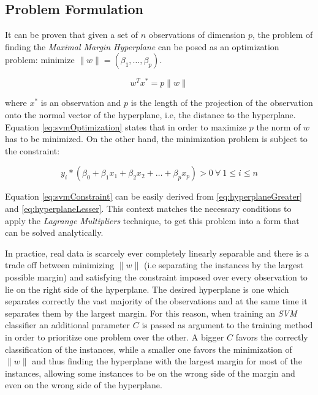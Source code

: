 \subsection{Problem Formulation}

It can be proven that given a set of $n$ observations of dimension $p$, the problem of
finding the \textit{Maximal Margin Hyperplane} can be posed as an optimization problem:
minimize $\| w \| = (\beta_{1}, \dotsc, \beta_{p})$.

\begin{equation}
\label{eq:svmOptimization}
w^{T}x^{*} = p\| w \|
\end{equation}

where $x^{*}$ is an observation and $p$ is the length of the projection of the observation
onto the normal vector of the hyperplane, i.e, the distance to the hyperplane.
Equation \ref{eq:svmOptimization} states that in order to maximize $p$ the norm of $w$
has to be minimized. On the other hand, the minimization problem is subject to the constraint:

\begin{equation}
  \label{eq:svmConstraint}
  y_{i} * (\beta_{0} + \beta_{1}x_{1} + \beta_{2}x_{2} + \dotsc + \beta_{p}x_{p}) > 0 \ \forall \ 1 \leq i \leq {n}
\end{equation}

Equation \ref{eq:svmConstraint} can be easily derived from \ref{eq:hyperplaneGreater} and
\ref{eq:hyperplaneLesser}.  This context matches the necessary conditions to apply
the \textit{Lagrange Multipliers} technique, to get this problem into a form
that can be solved analytically.

In practice, real data is scarcely ever completely linearly separable
and there is a trade off between
minimizing $\| w \|$ (i.e separating the instances by the largest possible margin)
and satisfying the constraint imposed over every
observation to lie on the right side of the hyperplane.
The desired hyperplane is one which separates correctly the vast majority of the observations and
at the same time it separates them by the largest margin. For this reason, when training an
\textit{SVM} classifier an additional parameter $C$ is passed as argument to the training
method in order to prioritize one problem over the other. A bigger $C$ favors the correctly
classification of the instances, while a smaller one favors the minimization of $\| w \|$
and thus finding the hyperplane with the largest margin for most of the instances, allowing
some instances to be on the wrong side of the margin and even on the wrong side of the
hyperplane.

